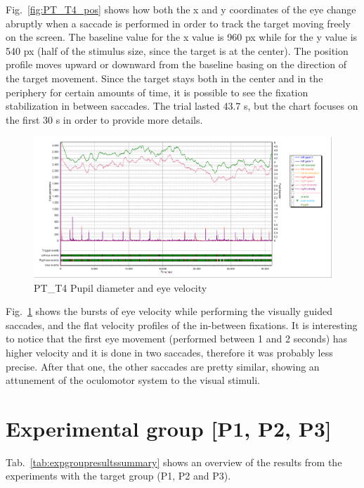 Fig.~\ref{fig:PT_T4_pos} shows how both the x and y coordinates of the eye change abruptly when a saccade is performed in order to track the target moving freely on the screen. The baseline value for the x value is 960 px while for the y value is 540 px (half of the stimulus size, since the target is at the center). The position profile moves upward or downward from the baseline basing on the direction of the target movement. Since the target stays both in the center and in the periphery for certain amounts of time, it is possible to see the fixation stabilization in between saccades. The trial lasted 43.7 s, but the chart focuses on the first 30 s in order to provide more details.

\begin{figure}[h]
  \centering
  \includegraphics[width=.8\textwidth]{figures/graphs/PT_T4(saccades)_VP.png}
  \caption[PT\_T4 pupil velocity]{PT\_T4 Pupil diameter and eye velocity}
  \label{fig:PT_T4_vel}
\end{figure}

Fig.~\ref{fig:PT_T4_vel} shows the bursts of eye velocity while performing the visually guided saccades, and the flat velocity profiles of the in-between fixations. It is interesting to notice that the first eye movement (performed between 1 and 2 seconds) has higher velocity and it is done in two saccades, therefore it was probably less precise. After that one, the other saccades are pretty similar, showing an attunement of the oculomotor system to the visual stimuli.





\section{Experimental group [P1, P2, P3]}
\label{sec:resexpgroup}

Tab.~\ref{tab:expgroupresultssummary} shows an overview of the results from the experiments with the target group (P1, P2 and P3).

